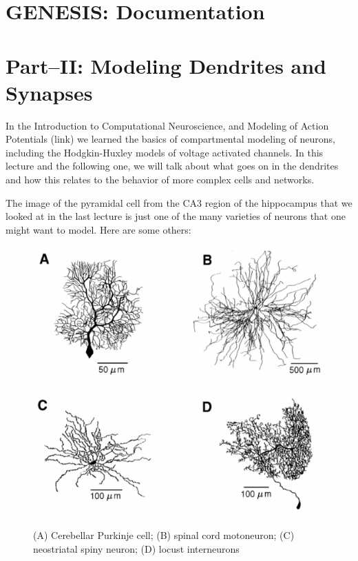 \documentclass[12pt]{article}
\begin{document}
\section*{GENESIS: Documentation}

\section*{Part--II: Modeling Dendrites and Synapses}

In the Introduction to Computational Neuroscience, and Modeling of Action Potentials (link) we learned the basics of compartmental modeling of neurons, including the Hodgkin-Huxley models of voltage activated channels. In this lecture and the following one, we will talk about what goes on in the dendrites and how this relates to the behavior of more complex cells and networks.

The image of the pyramidal cell from the CA3 region of the hippocampus that we looked at in the last lecture is just one of the many varieties of neurons that one might want to model. Here are some others:

\begin{figure}[h]
  \centering
 \includegraphics[scale=0.4]{figs/BoGfig5_1s.eps}
  \caption{(A) Cerebellar Purkinje cell; (B) spinal cord motoneuron; (C) neostriatal spiny neuron; (D) locust interneurons}
  \label{fig:neurons}
\end{figure}
\end{document}
